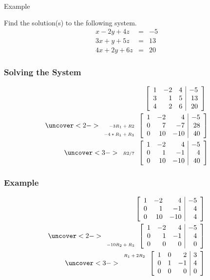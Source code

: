 \begin{frame}{Example}

  Find the solution(s) to the following system.
  \begin{eqnarray*}
    x - 2y + 4z  & = & -5 \\
    3x + y + 5z  & = & 13 \\
    4x + 2y + 6z & = & 20
  \end{eqnarray*}


\end{frame}


\begin{frame}
  \frametitle{Solving the System}

  \begin{eqnarray*}
      \stateThree{~}{~}{~}
      \startRowOps
      \oneRowOps{1}{-2}{4}{-5}
      \oneRowOps{3}{1}{5}{13}
      \oneRowOps{4}{2}{6}{20}
      \stopRowOps
    ~ \\
    \uncover<2->
    {
      \stateThree{~}{-3R_1+R2}{-4*R_1+R_3}
      \startRowOps
      \oneRowOps{1}{-2}{4}{-5}
      \oneRowOps{0}{7}{-7}{28}
      \oneRowOps{0}{10}{-10}{40}
      \stopRowOps
    }
    \\
    \uncover<3->
    {
      \stateThree{~}{R2/7}{~}
      \startRowOps
      \oneRowOps{1}{-2}{4}{-5}
      \oneRowOps{0}{1}{-1}{4}
      \oneRowOps{0}{10}{-10}{40}
      \stopRowOps
    }
  \end{eqnarray*}

\end{frame}


\begin{frame}
  \frametitle{Example}

  \begin{eqnarray*}
    \stateThree{~}{~}{~}
    \startRowOps
    \oneRowOps{1}{-2}{4}{-5}
    \oneRowOps{0}{1}{-1}{4}
    \oneRowOps{0}{10}{-10}{4}
    \stopRowOps
    \\
    \uncover<2->
    {
      \stateThree{~}{~}{-10R_2+R_3}
      \startRowOps
      \oneRowOps{1}{-2}{4}{-5}
      \oneRowOps{0}{1}{-1}{4}
      \oneRowOps{0}{0}{0}{0}
      \stopRowOps 
    }
    \\
    \uncover<3->
    {
      \stateThree{R_1+2R_2}{~}{~}
      \startRowOps
      \oneRowOps{1}{0}{2}{3}
      \oneRowOps{0}{1}{-1}{4}
      \oneRowOps{0}{0}{0}{0}
      \stopRowOps
    }
  \end{eqnarray*}

\end{frame}



